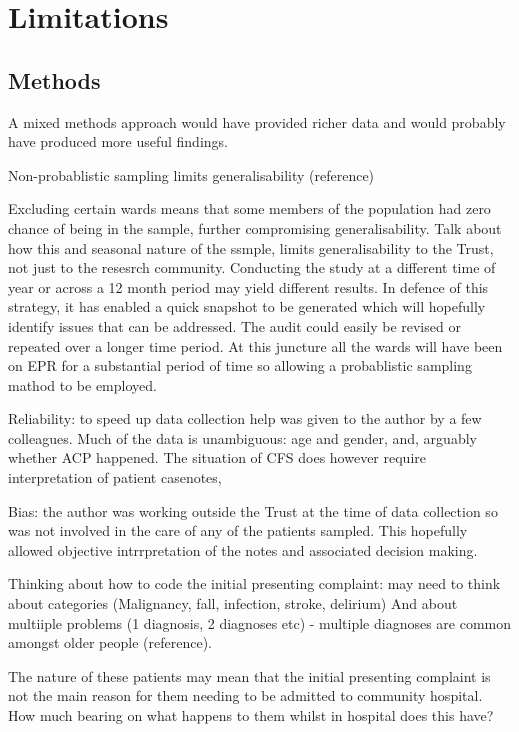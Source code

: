 \documentclass
[
	12pt,
	a4paper,
	oneside,
]{report}
\begin{document}
\section{Limitations}

\subsection{Methods}

A mixed methods approach would have provided richer data and would probably
have produced more useful findings.

Non-probablistic sampling limits generalisability (reference)

Excluding certain wards means that some members of the
population had zero chance of being in the sample,
further compromising generalisability. Talk about how this
and seasonal nature of the ssmple, limits generalisability
to the Trust, not just to the resesrch community.
Conducting the study at a different time of year or across
a 12 month period may yield different results. In defence
of this strategy, it has enabled a quick snapshot to be
generated which will hopefully identify issues that can be
addressed. The audit could easily be revised or repeated 
over a longer time period. At this juncture all the wards 
will have been on EPR for a substantial period of time so
allowing a probablistic sampling mathod to be employed.


Reliability: to speed up data collection help was given to the author by a few
colleagues. Much of the data is unambiguous: age and gender, and, arguably
whether ACP happened. The situation of CFS does however require interpretation
of patient casenotes, 

Bias: the author was working outside the Trust at the time 
of data collection so was not involved in the care of any
of the patients sampled. This hopefully allowed objective
intrrpretation of the notes and associated decision making.

Thinking about how to code the initial presenting complaint: may need to think about
categories (Malignancy, fall, infection, stroke, delirium) And about multiiple problems
(1 diagnosis, 2 diagnoses etc) - multiple diagnoses are 
common amongst older people (reference).

The nature of these patients may mean that the initial presenting complaint
is not the main reason for them needing to be admitted to community hospital.
How much bearing on what happens to them whilst in hospital does this have?
\end{document}
